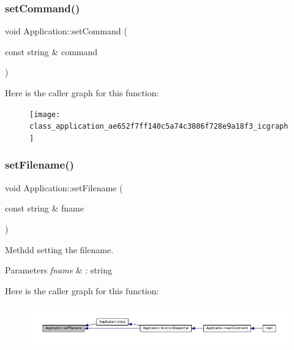 \subsubsection{\texorpdfstring{set\+Command()}{setCommand()}}
{\footnotesize\ttfamily void Application\+::set\+Command (\begin{DoxyParamCaption}\item[{const string \&}]{command }\end{DoxyParamCaption})}

Here is the caller graph for this function\+:
\nopagebreak
\begin{figure}[H]
\begin{center}
\leavevmode
\texttt{[image: class\_application\_ae652f7ff140c5a74c3806f728e9a18f3\_icgraph]}
\end{center}
\end{figure}
\mbox{\label{class_application_a76de879568ee39ac80484441716928d2}} 
\subsubsection{\texorpdfstring{set\+Filename()}{setFilename()}}
{\footnotesize\ttfamily void Application\+::set\+Filename (\begin{DoxyParamCaption}\item[{const string \&}]{fname }\end{DoxyParamCaption})}

Methdd setting the filename. 
\begin{DoxyParams}{Parameters}
{\em fname} & \+: string \\
\hline
\end{DoxyParams}
Here is the caller graph for this function\+:
\nopagebreak
\begin{figure}[H]
\begin{center}
\leavevmode
\includegraphics[width=350pt]{class_application_a76de879568ee39ac80484441716928d2_icgraph}
\end{center}
\end{figure}
\mbox{\label{class_application_a56b4a55e9eabd40b7f0033ba39631ebe}} 
